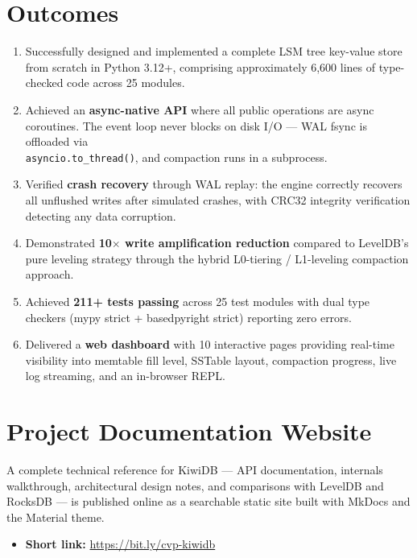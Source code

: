 \documentclass[oneside,a4paper,12pt]{book}
\begin{document}
\section{Outcomes}

\begin{enumerate}[leftmargin=2em]
    \item Successfully designed and implemented a complete LSM tree key-value store from scratch in Python 3.12+, comprising approximately 6,600 lines of type-checked code across 25 modules.

    \item Achieved an \textbf{async-native API} where all public operations are async coroutines. The event loop never blocks on disk I/O --- WAL fsync is offloaded via \\\texttt{asyncio.to\_thread()}, and compaction runs in a subprocess.

    \item Verified \textbf{crash recovery} through WAL replay: the engine correctly recovers all unflushed writes after simulated crashes, with CRC32 integrity verification detecting any data corruption.

    \item Demonstrated \textbf{10$\times$ write amplification reduction} compared to LevelDB's pure leveling strategy through the hybrid L0-tiering / L1-leveling compaction approach.

    \item Achieved \textbf{211+ tests passing} across 25 test modules with dual type checkers (mypy strict + basedpyright strict) reporting zero errors.

    \item Delivered a \textbf{web dashboard} with 10 interactive pages providing real-time visibility into memtable fill level, SSTable layout, compaction progress, live log streaming, and an in-browser REPL.
\end{enumerate}

\section{Project Documentation Website}

A complete technical reference for KiwiDB --- API documentation, internals walkthrough, architectural design notes, and comparisons with LevelDB and RocksDB --- is published online as a searchable static site built with MkDocs and the Material theme.

\begin{itemize}[leftmargin=2em]
    \item \textbf{Short link:} \url{https://bit.ly/cvp-kiwidb}
\end{itemize}
\end{document}
